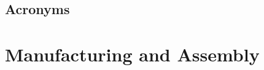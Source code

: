 \documentclass[12pt,a4paper]{scrbook}
\begin{document}
 


\newpage

\tableofcontents
\cleardoublepage

 
\chapter{Acronyms}

\cleardoublepage
 
\part{Manufacturing and Assembly} 










\cleardoublepage

\end{document}

